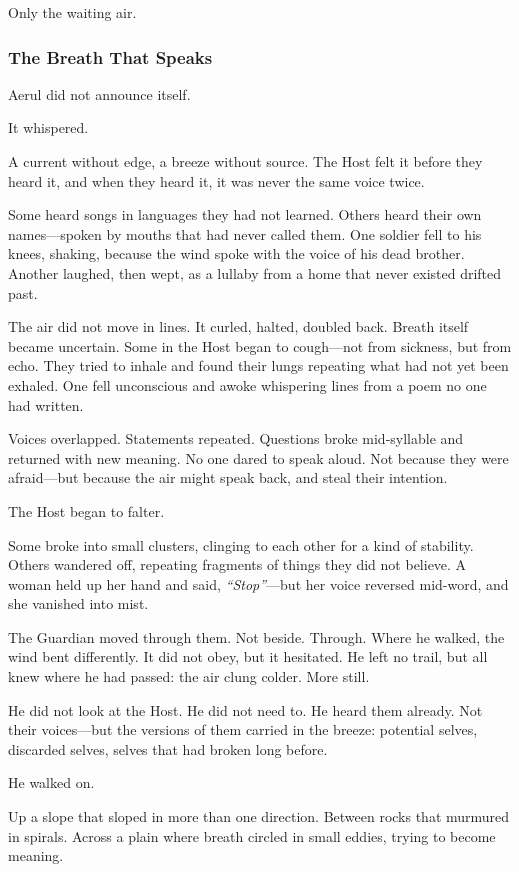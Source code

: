 \documentclass[12pt]{article}
\begin{document}
Only the waiting air.

\dotfill

\subsubsection{The Breath That Speaks}

Aerul did not announce itself.

It whispered.

A current without edge, a breeze without source. The Host felt it before they heard it, and when they heard it, it was never the same voice twice.

Some heard songs in languages they had not learned. Others heard their own names—spoken by mouths that had never called them. One soldier fell to his knees, shaking, because the wind spoke with the voice of his dead brother. Another laughed, then wept, as a lullaby from a home that never existed drifted past.

The air did not move in lines. It curled, halted, doubled back. Breath itself became uncertain. Some in the Host began to cough—not from sickness, but from echo. They tried to inhale and found their lungs repeating what had not yet been exhaled. One fell unconscious and awoke whispering lines from a poem no one had written.

Voices overlapped. Statements repeated. Questions broke mid-syllable and returned with new meaning. No one dared to speak aloud. Not because they were afraid—but because the air might speak back, and steal their intention.

The Host began to falter.

Some broke into small clusters, clinging to each other for a kind of stability. Others wandered off, repeating fragments of things they did not believe. A woman held up her hand and said, \textit{``Stop''}—but her voice reversed mid-word, and she vanished into mist.

The Guardian moved through them. Not beside. Through. Where he walked, the wind bent differently. It did not obey, but it hesitated. He left no trail, but all knew where he had passed: the air clung colder. More still.

He did not look at the Host. He did not need to. He heard them already. Not their voices—but the versions of them carried in the breeze: potential selves, discarded selves, selves that had broken long before.

He walked on.

Up a slope that sloped in more than one direction. Between rocks that murmured in spirals. Across a plain where breath circled in small eddies, trying to become meaning.
\end{document}
